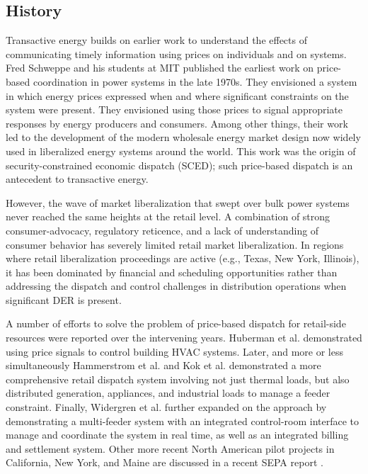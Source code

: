 \subsection{History}

Transactive energy builds on earlier work to understand the effects of communicating timely information using prices on individuals and on systems. Fred Schweppe and his students at MIT \cite{schweppe1978} published the earliest work on price-based coordination in power systems in the late 1970s.  They envisioned a system in which energy prices expressed when and where significant constraints on the system were present. They envisioned using those prices to signal appropriate responses by energy producers and consumers. Among other things, their work led to the development of the modern wholesale energy market design now widely used in liberalized energy systems around the world. This work was the origin of security-constrained economic dispatch (SCED); such price-based dispatch is an antecedent to transactive energy.

However, the wave of market liberalization that swept over bulk power systems never reached the same heights at the retail level.  A combination of strong consumer-advocacy, regulatory reticence, and a lack of understanding of consumer behavior has severely limited retail market liberalization.  In regions where retail liberalization proceedings are active (e.g., Texas, New York, Illinois), it has been dominated by financial and scheduling opportunities rather than addressing the dispatch and control challenges in distribution operations when significant DER is present.

A number of efforts to solve the problem of price-based dispatch for retail-side resources were reported over the intervening years.  Huberman et al. \cite{huberman1991} demonstrated using price signals to control building HVAC systems.  Later, and more or less simultaneously Hammerstrom et al. \cite{hammerstrom2007} and Kok et al. \cite{kok2013} demonstrated a more comprehensive retail dispatch system involving not just thermal loads, but also distributed generation, appliances, and industrial loads to manage a feeder constraint.  Finally, Widergren et al. \cite{widergren2014} further expanded on the approach by demonstrating a multi-feeder system with an integrated control-room interface to manage and coordinate the system in real time, as well as an integrated billing and settlement system. Other more recent North American pilot projects in California, New York, and Maine are discussed in a recent SEPA report \cite{sepa2019}.

